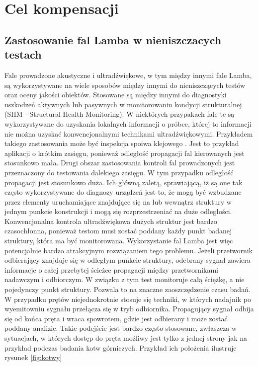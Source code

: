 
\section{Cel kompensacji}
\label{sec:cel_komp}

\subsection{Zastosowanie fal Lamba w nieniszczacych testach}

Fale prowadzone akustyczne i ultradźwiękowe, w tym między innymi fale Lamba, są wykorzystywane na wiele sposobów między innymi do nieniszczących testów oraz oceny jakości obiektów. Stosowane są między innymi do diagnostyki uszkodzeń aktywnych lub pasywnych w monitorowaniu kondycji strukturalnej (SHM - Structural Health Monitoring). W niektórych przypakach fale te są wykorzystywane do uzyskania lokalnych informacji o próbce, której to informacji nie można uzyskać konwencjonalnymi technikami ultradźwiękowymi. Przykładem takiego zastosowania może być inspekcja spoiwa klejowego \cite{kasia}. Jest to przykład aplikacji o krótkim zasięgu, ponieważ odległość propagacji fal kierowanych jest stosunkowo mała. Drugi obszar zastosowania kontroli fal prowadzonych jest przeznaczony do testowania dalekiego zasięgu. W tym przypadku odległość propagacji jest stosunkowo duża. Ich główną zaletą, sprawiającą, iż są one tak często wykorzystywane do diagnozy urządzeń jest to, że mogą być wzbudzane przez elementy uruchamiające znajdujące się na lub wewnątrz struktury w jednym punkcie konstrukcji i mogą się rozprzestrzeniać na duże odległości. Konwencjonalna kontrola ultradźwiękowa dużych struktur jest bardzo czasochłonna, ponieważ testom musi zostać poddany każdy punkt badanej struktury, która ma być monitorowana. Wykorzystanie fal Lamba jest więc potencjalnie bardzo atrakcyjnym rozwiązaniem tego problemu. Jeżeli przetwornik odbierający znajduje się w odległym punkcie struktury, odebrany sygnał zawiera informacje o całej przebytej ścieżce propagacji między przetwornikami nadawczym i odbiorczym. W związku z tym test monitoruje całą ściężkę, a nie pojedynczy punkt struktury. Pozwala to na znaczne zaoszczędzenie czasu badań. W przypadku prętów niejednokrotnie stosuje się techniki, w których nadajnik po wyemitowniu sygnału przełącza się w tryb odbiornika. Propagujący sygnał odbija się od końca pręta i wraca spowrotem, gdzie jest odbierany i może zostać poddany analizie. Takie podejście jest bardzo często stosowane, zwłaszcza w sytuacjach, w których dostęp do pręta możliwy jest tylko z jednej strony jak na przykład podczas badania kotw górniczych. Przykład ich położenia ilustruje rysunek \ref{fig:kotwy}
